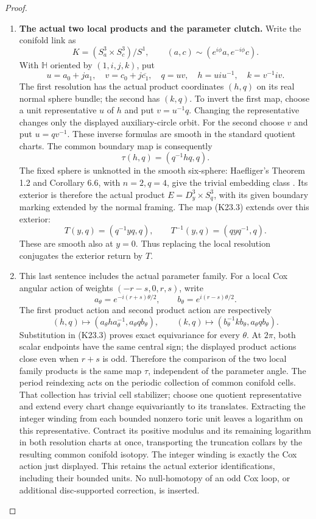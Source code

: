 \begin{proof}
\begin{enumerate}[label=\arabic*.]
\item \par\medskip\noindent\textbf{The actual two local products and the parameter clutch.}\enspace
Write the conifold link as
\[
 K=(S^3_a\times S^3_c)/S^1,\qquad
 (a,c)\sim(e^{i\phi}a,e^{-i\phi}c).
\]
With \(\mathbb H\) oriented by \((1,i,j,k)\), put
\[
 u=a_0+j a_1,\quad v=c_0+j\overline{c_1},\quad
 q=uv,\quad h=u i u^{-1},\quad k=v^{-1} i v.
                                                        \tag{K23.2}
\]
The first resolution has the actual product coordinates \((h,q)\)
on its real normal sphere bundle; the second has \((k,q)\).
To invert the first map, choose a unit representative \(u\) of \(h\)
and put \(v=u^{-1}q\). Changing the representative changes only the
displayed auxiliary-circle orbit. For the second choose \(v\) and
put \(u=qv^{-1}\). These inverse formulas are smooth in the standard
quotient charts. The common boundary map is consequently
\[
             \tau(h,q)=(q^{-1}h q,q).                  \tag{K23.3}
\]
The fixed sphere is unknotted in the smooth six-sphere:
Haefliger's Theorem 1.2 and Corollary 6.6, with \(n=2,q=4\),
give the trivial embedding class \cite{Haefliger1966}.
Its exterior is therefore the actual product
\(E=D^3_y\times S^3_q\), with its given boundary marking extended
by the normal framing. The map (K23.3) extends over this exterior:
\[
 T(y,q)=(q^{-1}yq,q),\qquad
 T^{-1}(y,q)=(q yq^{-1},q).                           \tag{K23.4}
\]
These are smooth also at \(y=0\). Thus replacing the local resolution
conjugates the exterior return by \(T\).

\item This last sentence includes the actual parameter family. For a
local Cox angular action of weights
\((-r-s,0,r,s)\), write
\[
 a_\theta=e^{-i(r+s)\theta/2},\qquad
 b_\theta=e^{i(r-s)\theta/2}.
\]
The first product action and second product action are respectively
\[
 (h,q)\longmapsto
 (a_\theta h a_\theta^{-1},a_\theta q b_\theta),\qquad
 (k,q)\longmapsto
 (b_\theta^{-1}k b_\theta,a_\theta q b_\theta).
\]
Substitution in (K23.3) proves exact equivariance for every \(\theta\).
At \(2\pi\), both scalar endpoints have the same central sign;
the displayed product actions close even when \(r+s\) is odd.
Therefore the comparison of the two local family products is the
same map \(\tau\), independent of the parameter angle. The period
reindexing acts on the periodic collection of common conifold cells.
That collection has trivial cell stabilizer; choose one quotient
representative and extend every chart change equivariantly to its
translates. Extracting the integer winding from each bounded
nonzero toric unit leaves a logarithm on this representative. Contract
its positive modulus and its remaining logarithm in both resolution
charts at once, transporting the truncation collars by the resulting
common conifold isotopy. The integer winding is exactly the Cox
action just displayed. This retains the actual exterior
identifications, including their bounded units. No null-homotopy of
an odd Cox loop, or additional disc-supported correction, is inserted.


\end{enumerate}
\end{proof}
